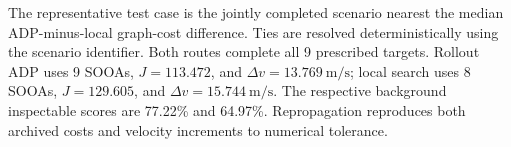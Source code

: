 The representative test case is the jointly completed scenario nearest the median ADP-minus-local graph-cost difference. Ties are resolved deterministically using the scenario identifier. Both routes complete all 9 prescribed targets. Rollout ADP uses 9 SOOAs, $J=113.472$, and $\Delta v=13.769~\mathrm{m/s}$; local search uses 8 SOOAs, $J=129.605$, and $\Delta v=15.744~\mathrm{m/s}$. The respective background inspectable scores are 77.22\% and 64.97\%. Repropagation reproduces both archived costs and velocity increments to numerical tolerance.
